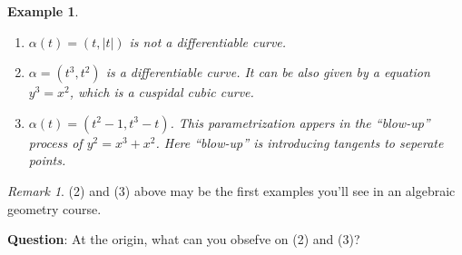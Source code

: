 \documentclass[UTF8,oneside,11pt]{book}
\theoremstyle{plain}\newtheorem{thm}{Theorem}
\theoremstyle{definition}\newtheorem{defn}[thm]{Definition}
\theoremstyle{plain}\newtheorem{axiom}[thm]{Axiom}
\theoremstyle{plain}\newtheorem{coro}[thm]{Corollary}
\theoremstyle{plain}\newtheorem{lemma}[thm]{Lemma}
\theoremstyle{plain}\newtheorem{prop}[thm]{Proposition}
\theoremstyle{plain}\newtheorem{conj}[thm]{Conjecture}
\theoremstyle{plain}\newtheorem{ques}[thm]{Problem}
\theoremstyle{plain}\newtheorem{const}[thm]{Construction}
\theoremstyle{remark}\newtheorem{notation}[thm]{Notation}
\theoremstyle{plain}\newtheorem*{app}{Application}
\theoremstyle{plain}\newtheorem*{exam}{Example}
\theoremstyle{plain}\newtheorem*{exer}{Exercise}
\theoremstyle{remark}\newtheorem*{remark}{Remark}
\theoremstyle{remark}\newtheorem*{note}{\small{Note}}
\numberwithin{equation}{section}
\numberwithin{thm}{section}
\begin{document}
\begin{exam}
    \hfill
    \begin{enumerate}[(1)]
        \item $\alpha(t)=(t,|t|)$ is not a differentiable curve.
        \begin{center}
        \end{center}
        \item $\alpha=(t^3,t^2)$ is a differentiable curve. It can be also given by a equation $y^3=x^2$, which is a cuspidal cubic curve.
        \begin{center}
        \end{center}
        \item $\alpha(t)=(t^2-1,t^3-t)$. This parametrization appers in the ``blow-up'' process of $y^2=x^3+x^2$. Here ``blow-up'' is introducing tangents to seperate points.
        \begin{center}
        \end{center}
    \end{enumerate}
\end{exam}
\begin{remark}
    (2) and (3) above may be the first examples you'll see in an algebraic geometry course.
\end{remark}
\noindent
\textbf{Question}: At the origin, what can you obsefve on (2) and (3)?
\end{document}
